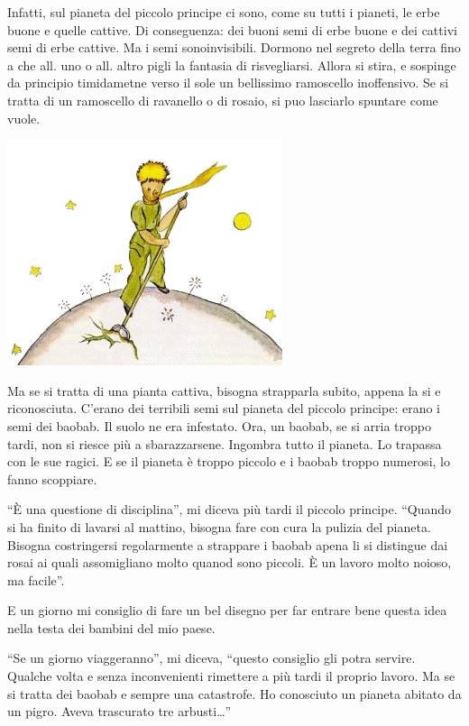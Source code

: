 \documentclass[11pt]{scrbook}
\begin{document}
Infatti, sul pianeta del piccolo principe ci sono, come su tutti i
pianeti, le erbe buone e quelle cattive. Di conseguenza: dei buoni semi
di erbe buone e dei cattivi semi di erbe cattive. Ma i semi
sonoinvisibili. Dormono nel segreto della terra fino a che all. uno o
all. altro pigli la fantasia di risvegliarsi. Allora si stira, e
sospinge da principio timidametne verso il sole un bellissimo ramoscello
inoffensivo. Se si tratta di un ramoscello di ravanello o di rosaio, si
puo lasciarlo spuntare come vuole.

\begin{center}
\includegraphics{img/5b}
\end{center}

Ma se si tratta di una pianta cattiva, bisogna strapparla subito, appena
la si e riconosciuta. C'erano dei terribili semi sul pianeta del piccolo
principe: erano i semi dei baobab. Il suolo ne era infestato. Ora, un
baobab, se si arria troppo tardi, non si riesce più a sbarazzarsene.
Ingombra tutto il pianeta. Lo trapassa con le sue ragici. E se il
pianeta è troppo piccolo e i baobab troppo numerosi, lo fanno scoppiare.

``È una questione di disciplina'', mi diceva più tardi il piccolo
principe. ``Quando si ha finito di lavarsi al mattino, bisogna fare con
cura la pulizia del pianeta. Bisogna costringersi regolarmente a
strappare i baobab apena li si distingue dai rosai ai quali assomigliano
molto quanod sono piccoli. È un lavoro molto noioso, ma facile''.

E un giorno mi consiglio di fare un bel disegno per far entrare bene
questa idea nella testa dei bambini del mio paese.

``Se un giorno viaggeranno'', mi diceva, ``questo consiglio gli potra
servire. Qualche volta e senza inconvenienti rimettere a più tardi il
proprio lavoro. Ma se si tratta dei baobab e sempre una catastrofe. Ho
conosciuto un pianeta abitato da un pigro. Aveva trascurato tre
arbusti\ldots{}''
\end{document}
